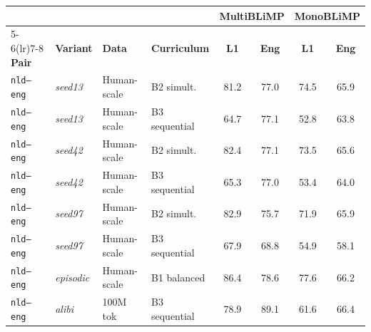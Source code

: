 \begin{table}[t]
\centering\small
\setlength{\tabcolsep}{4pt}
\begin{tabular}{lll l cc cc}
\toprule
& & & & \multicolumn{2}{c}{\textbf{MultiBLiMP}} & \multicolumn{2}{c}{\textbf{MonoBLiMP}} \\
\cmidrule(lr){5-6}\cmidrule(lr){7-8}
\textbf{Pair} & \textbf{Variant} & \textbf{Data} & \textbf{Curriculum} & \textbf{L1} & \textbf{Eng} & \textbf{L1} & \textbf{Eng} \\
\midrule
\texttt{nld--eng} & \textit{seed13} & Human-scale & B2 simult. & \cellcolor[rgb]{0.827,1.000,0.827} 81.2 & \cellcolor[rgb]{0.853,1.000,0.853} 77.0 & \cellcolor[rgb]{0.826,1.000,0.826} 74.5 & \cellcolor[rgb]{0.869,1.000,0.869} 65.9 \\
\texttt{nld--eng} & \textit{seed13} & Human-scale & B3 sequential & \cellcolor[rgb]{0.919,1.000,0.919} 64.7 & \cellcolor[rgb]{0.852,1.000,0.852} 77.1 & \cellcolor[rgb]{0.980,1.000,0.980} 52.8 & \cellcolor[rgb]{0.886,1.000,0.886} 63.8 \\
\texttt{nld--eng} & \textit{seed42} & Human-scale & B2 simult. & \cellcolor[rgb]{0.821,1.000,0.821} 82.4 & \cellcolor[rgb]{0.852,1.000,0.852} 77.1 & \cellcolor[rgb]{0.833,1.000,0.833} 73.5 & \cellcolor[rgb]{0.872,1.000,0.872} 65.6 \\
\texttt{nld--eng} & \textit{seed42} & Human-scale & B3 sequential & \cellcolor[rgb]{0.915,1.000,0.915} 65.3 & \cellcolor[rgb]{0.853,1.000,0.853} 77.0 & \cellcolor[rgb]{0.976,1.000,0.976} 53.4 & \cellcolor[rgb]{0.885,1.000,0.885} 64.0 \\
\texttt{nld--eng} & \textit{seed97} & Human-scale & B2 simult. & \cellcolor[rgb]{0.818,1.000,0.818} 82.9 & \cellcolor[rgb]{0.860,1.000,0.860} 75.7 & \cellcolor[rgb]{0.844,1.000,0.844} 71.9 & \cellcolor[rgb]{0.869,1.000,0.869} 65.9 \\
\texttt{nld--eng} & \textit{seed97} & Human-scale & B3 sequential & \cellcolor[rgb]{0.901,1.000,0.901} 67.9 & \cellcolor[rgb]{0.897,1.000,0.897} 68.8 & \cellcolor[rgb]{0.965,1.000,0.965} 54.9 & \cellcolor[rgb]{0.933,1.000,0.933} 58.1 \\
\texttt{nld--eng} & \textit{episodic} & Human-scale & B1 balanced & \cellcolor[rgb]{0.799,1.000,0.799} 86.4 & \cellcolor[rgb]{0.844,1.000,0.844} 78.6 & \cellcolor[rgb]{0.804,1.000,0.804} 77.6 & \cellcolor[rgb]{0.867,1.000,0.867} 66.2 \\
\texttt{nld--eng} & \textit{alibi} & 100M tok & B3 sequential & \cellcolor[rgb]{0.840,1.000,0.840} 78.9 & \cellcolor[rgb]{0.787,1.000,0.787} 89.1 & \cellcolor[rgb]{0.918,1.000,0.918} 61.6 & \cellcolor[rgb]{0.865,1.000,0.865} 66.4 \\

\end{tabular}
\end{table}
